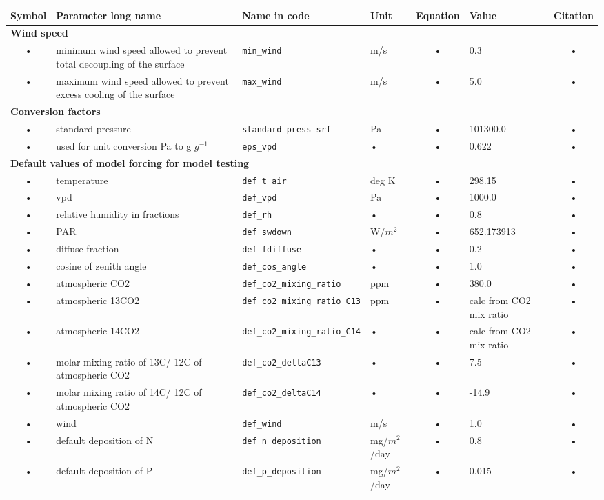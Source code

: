 \begin{table}
\begin{tabularx}{\linewidth}{|c|X|l|l|c|l|c|} %
\hline 
Symbol & Parameter long name & Name in code & Unit & Equation & Value & Citation \\ 
\hline 

\multicolumn{6}{l}{\bf Wind speed}\\
\hline
• & minimum wind speed allowed to prevent total decoupling of the surface & \texttt{min\_wind} & m/s & • & 0.3 & • \\
• & maximum wind speed allowed to prevent excess cooling of the surface & \texttt{max\_wind} & m/s & • & 5.0 & • \\
\hline 

\multicolumn{6}{l}{\bf Conversion factors}\\
\hline
• & standard pressure & \texttt{standard\_press\_srf} & Pa & • & 101300.0 & • \\
• & used for unit conversion Pa to g $g^{-1}$ & \texttt{eps\_vpd} & • & • & 0.622 & • \\
\hline 

\multicolumn{6}{l}{\bf Default values of model forcing for model testing}\\
\hline
• & temperature & \texttt{def\_t\_air} & deg K & • & 298.15 & • \\
• & vpd & \texttt{def\_vpd} & Pa & • & 1000.0 & • \\
• & relative humidity in fractions & \texttt{def\_rh} & • & • & 0.8 & • \\
• & PAR & \texttt{def\_swdown} & W/$m^2$ & • & 652.173913 & • \\
• & diffuse fraction & \texttt{def\_fdiffuse} & • & • & 0.2 & • \\
• & cosine of zenith angle & \texttt{def\_cos\_angle} & • & • & 1.0 & • \\
• & atmospheric CO2 & \texttt{def\_co2\_mixing\_ratio} & ppm & • & 380.0 & • \\
• & atmospheric 13CO2 & \texttt{def\_co2\_mixing\_ratio\_C13} & ppm & • & calc from CO2 mix ratio & • \\
• & atmospheric 14CO2 & \texttt{def\_co2\_mixing\_ratio\_C14} & • & • & calc from CO2 mix ratio & • \\
• & molar mixing ratio of 13C/ 12C of atmospheric CO2 & \texttt{def\_co2\_deltaC13} & • & • & 7.5 & • \\
• & molar mixing ratio of 14C/ 12C of atmospheric CO2 & \texttt{def\_co2\_deltaC14} & • & • & -14.9 & • \\
• & wind & \texttt{def\_wind} & m/s & • & 1.0 & • \\
• & default deposition of N & \texttt{def\_n\_deposition} & mg/$m^2$/day & • & 0.8 & • \\
• & default deposition of P & \texttt{def\_p\_deposition} & mg/$m^2$/day & • & 0.015 & • \\
\hline
\end{tabularx}
\end{table}




\pagebreak

\newpage

